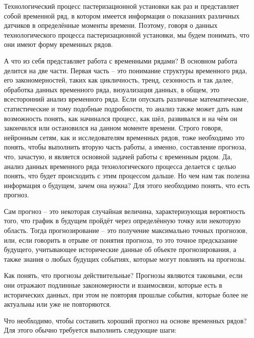 {  \par \redline Технологический процесс пастеризационной установки как раз и представляет собой временной ряд, в котором имеется информация о показаниях различных датчиков в определённые моменты времени. Поэтому, говоря о данных технологического процесса пастеризационной установки, мы будем понимать, что они имеют форму временных рядов.

  \par \redline А что из себя представляет работа с временными рядами? В основном работа делится на две части. Первая часть {--} это понимание структуры временного ряда, его закономерностей, таких как цикличность, тренд, сезонность и так далее, обработка данных временного ряда, визуализация данных, в общем, это всесторонний анализ временного ряда. Если опускать различные математические, статистические и тому подобные подробности, то анализ также может дать нам возможность понять, как начинался процесс, как шёл, развивался и на чём он закончился или остановился на данном моменте времени.  Строго говоря, нейронным сетям, как и исследователям временных рядов, тоже необходимо это понять, чтобы выполнить вторую часть работы, а именно, составление прогноза, что, зачастую, и является основной задачей работы с временным рядом. Да, анализ данных временного ряда технологического процесса делается с целью понять, что будет происходить с этим процессом дальше. Но чем нам так полезна информация о будущем, зачем она нужна? Для этого необходимо понять, что есть прогноз.

  \par \redline Сам прогноз {--} это некоторая случайная величина, характеризующая вероятность того, что график в будущем пройдёт через определённую точку или некоторую область. Тогда прогнозирование {--} это получение максимально точных прогнозов, или, если говорить в отрыве от понятия прогноза, то это точное предсказание будущего, учитывающее исторические данные об объекте прогнозирования, а также знания о любых будущих событиях, которые могут повлиять на прогнозы.

  \par \redline Как понять, что прогнозы действительные? Прогнозы являются таковыми, если они отражают подлинные закономерности и взаимосвязи, которые есть в исторических данных, при этом не повторяя прошлые события, которые более не актуальны или уже не повторяются.

  \par \redline Что необходимо, чтобы составить хороший прогноз на основе временных рядов? Для этого обычно требуется выполнить следующие шаги:

}
